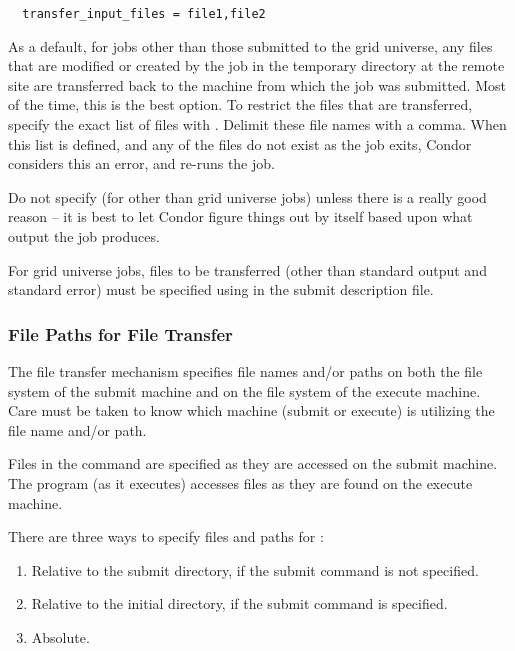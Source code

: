 \begin{verbatim}
  transfer_input_files = file1,file2 
\end{verbatim}

As a default, for jobs other than those submitted to the grid universe,
any files that are modified or created by the job in the
temporary directory at the remote site are transferred back
to the machine from which the job was submitted.
Most of the time, this is the best option.
To restrict the files that are transferred,
specify the exact list of files with  .
Delimit these file names with a comma.
When this list is defined, and any of the files do not exist as the
job exits, Condor considers this an error, and re-runs the job.

\Warn Do not specify  (for other than
grid universe jobs) unless there is a
really good reason -- it is best to let Condor figure things out by
itself based upon what output the job produces.

For grid universe jobs, files to be transferred 
(other than standard output and standard error)
must be specified using 
in the submit description file. 

\subsubsection{File Paths for File Transfer}



The file transfer mechanism specifies file names and/or paths on
both the file system of the submit machine and on the
file system of the execute machine.
Care must be taken to know which machine (submit or execute)
is utilizing the file name and/or path. 

Files in the  command
are specified as they are accessed on the submit machine.
The program (as it executes) accesses files as they are
found on the execute machine.

There are three ways to specify files and paths
for :
\begin{enumerate}
\item Relative to the submit directory, if the submit command
 is not specified.
\item Relative to the initial directory, if the submit command 
 is specified.
\item Absolute.
\end{enumerate}


